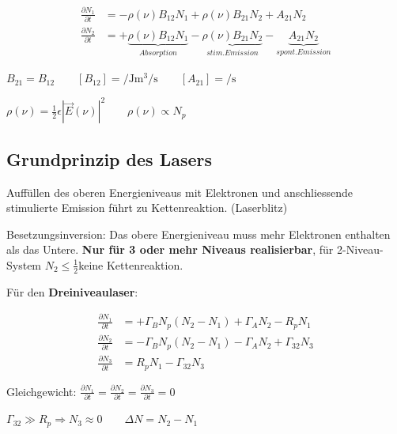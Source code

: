 \documentclass[10pt,a4paper]{scrartcl}
\begin{document}
\begin{multicols*}{3}
	\begin{align*}
	\frac{\partial N_1}{\partial t} & = -\rho(\nu)B_{12}N_1+\rho(\nu)B_{21}N_2+A_{21}N_2\\
	\frac{\partial N_2}{\partial t} & = +\underbrace{\rho(\nu)B_{12}N_1}_{Absorption}-\underbrace{\rho(\nu)B_{21}N_2}_{stim. Emission}-\underbrace{A_{21}N_2}_{spont. Emission}
	\end{align*}
	
	
	$B_{21}=B_{12}\qquad [B_{12}]=\si{\per\joule\meter\cubed\per\second}\qquad [A_{21}]=\si{\per\second}$
	
	$\rho(\nu)=\frac{1}{2}\epsilon|\vec{E}(\nu)|^2\qquad \rho(\nu)\propto N_p$ 
	
	
	 

	\subsection{Grundprinzip des Lasers}
	
	Auffüllen des oberen Energieniveaus mit Elektronen und anschliessende stimulierte Emission führt zu Kettenreaktion. (Laserblitz)
	
	Besetzungsinversion: Das obere Energieniveau muss mehr Elektronen enthalten als das Untere. \textbf{Nur für 3 oder mehr Niveaus realisierbar}, für 2-Niveau-System $N_2\leq\frac{1}{2}$\dahe keine Kettenreaktion.
	
	Für den \textbf{Dreiniveaulaser}:
	
	\begin{align*}
	\frac{\partial N_1}{\partial t}&=+\Gamma_BN_p(N_2-N_1)+\Gamma_AN_2-R_pN_1\\
	\frac{\partial N_2}{\partial t}&=-\Gamma_BN_p(N_2-N_1)-\Gamma_AN_2+\Gamma_{32}N_3\\
	\frac{\partial N_3}{\partial t}&=R_pN_1-\Gamma_{32}N_3
	\end{align*}
	
	
	Gleichgewicht: $\frac{\partial N_1}{\partial t}=\frac{\partial N_2}{\partial t}=\frac{\partial N_3}{\partial t}=0$
	
	$\Gamma_{32}\gg R_p\Rightarrow N_3 \approx 0\qquad \Delta N = N_2-N_1$
	
	\finn	
	

\end{multicols*}
\end{document}
